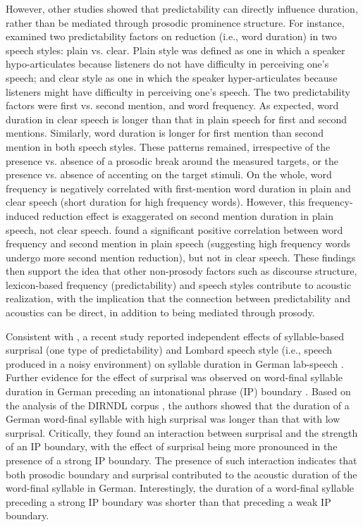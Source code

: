 \documentclass[output=paper,colorlinks,citecolor=brown]{langscibook}
\begin{document}
However, other studies showed that predictability can directly influence duration, rather than be mediated through prosodic prominence structure. For instance, \citet{Baker2009} examined two predictability factors on reduction (i.e., word duration) in two speech styles: plain vs. clear. Plain style was defined as one in which a speaker hypo-articulates because listeners do not have difficulty in perceiving one’s speech; and clear style as one in which the speaker hyper-articulates because listeners might have difficulty in perceiving one’s speech. The two predictability factors were first vs. second mention, and word frequency. As expected, word duration in clear speech is longer than that in plain speech for first and second mentions. Similarly, word duration is longer for first mention than second mention in both speech styles. These patterns remained, irrespective of the presence vs. absence of a prosodic break around the measured targets, or the presence vs. absence of accenting on the target stimuli. On the whole, word frequency is negatively correlated with first-mention word duration in plain and clear speech (short duration for high frequency words). However, this frequency-induced reduction effect is exaggerated on second mention duration in plain speech, not clear speech.  \citet{Baker2009} found a significant positive correlation between word frequency and second mention in plain speech (suggesting high frequency words undergo more second mention reduction), but not in clear speech. These findings then support the idea that other non-prosody factors such as discourse structure, lexicon-based frequency (predictability) and speech styles contribute to acoustic realization, with the implication that the connection between predictability and acoustics can be direct, in addition to being mediated through prosody.

Consistent with \citet{Baker2009}, a recent study reported independent effects of syllable-based surprisal (one type of predictability) and Lombard speech style (i.e., speech produced in a noisy environment) on syllable duration in German lab-speech \citep{Ibrahim2022}. Further evidence for the effect of surprisal was observed on word-final syllable duration in German preceding an intonational phrase (IP) boundary \citep{Andreeva2020}. Based on the analysis of the DIRNDL corpus \citep{Eckart2012}, the authors showed that the duration of a German word-final syllable with high surprisal was longer than that with low surprisal. Critically, they found an interaction between surprisal and the strength of an IP boundary, with the effect of surprisal being more pronounced in the presence of a strong IP boundary. The presence of such interaction indicates that both prosodic boundary and surprisal contributed to the acoustic duration of the word-final syllable in German. Interestingly, the duration of a word-final syllable preceding a strong IP boundary was shorter than that preceding a weak IP boundary. 
\end{document}
